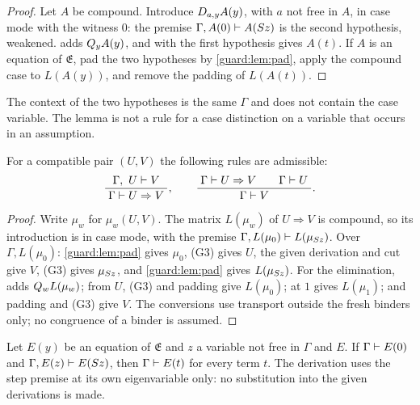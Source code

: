 \begin{proof}
Let $A$ be compound.  Introduce $D_{a,y}A(y)$, with $a$ not free in $A$,
in case mode with the witness $0$: the premise
$\Gamma,A(0)\vdash A(S z)$ is the second hypothesis, weakened.
 adds $Q_{y}A(y)$, and  with the first hypothesis
gives $A(t)$.  If $A$ is an equation of $\mathfrak E$, pad the two
hypotheses by \cref{guard:lem:pad}, apply the compound case to $L(A(y))$,
and remove the padding of $L(A(t))$.
\end{proof}

The context of the two hypotheses is the same $\Gamma$ and does not contain
the case variable.  The lemma is not a rule for a case distinction on a
variable that occurs in an assumption.

\begin{lemma}
\label{guard:lem:imp}
For a compatible pair $(U,V)$ the following rules are admissible:
\[
 \dfrac{\;\Gamma,\ U\vdash V\;}{\;\Gamma\vdash U\Rightarrow V\;},
 \qquad
 \dfrac{\;\Gamma\vdash U\Rightarrow V\qquad\Gamma\vdash U\;}{\;\Gamma\vdash V\;}.
\]
\end{lemma}

\begin{proof}
Write $\mu_w$ for $\mu_w(U,V)$.  The matrix $L(\mu_w)$ of $U\Rightarrow V$
is compound, so its introduction is in case mode, with the premise
$\Gamma,L(\mu_0)\vdash L(\mu_{S z})$.  Over $\Gamma,L(\mu_0)$:
\cref{guard:lem:pad} gives $\mu_0$, (G3) gives $U$, the given derivation and
cut give $V$, (G3) gives $\mu_{S z}$, and \cref{guard:lem:pad} gives
$L(\mu_{S z})$.  For the elimination,  adds
$Q_{w}L(\mu_w)$; from $U$, (G3) and padding give $L(\mu_0)$; 
at $1$ gives $L(\mu_1)$; and padding and (G3) give $V$.  The conversions
use transport outside the fresh binders only; no congruence of a binder is
assumed.
\end{proof}

\begin{theorem}
\label{guard:thm:ei}
Let $E(y)$ be an equation of $\mathfrak E$ and $z$ a variable not free in
$\Gamma$ and $E$.  If $\Gamma\vdash E(0)$ and
$\Gamma,E(z)\vdash E(S z)$, then $\Gamma\vdash E(t)$ for every term
$t$.  The derivation uses the step premise at its own eigenvariable only:
no substitution into the given derivations is made.
\end{theorem}

